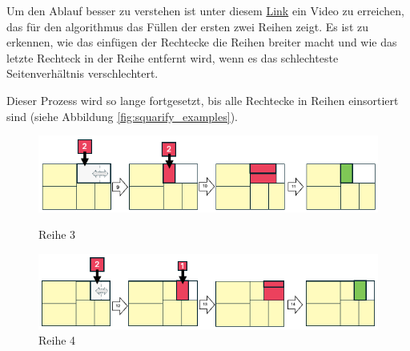 Um den Ablauf besser zu verstehen ist unter diesem \href{https://github.com/BenediktMehl/master-thesis/blob/main/images/squarify_example.gif}{Link} \cite{squarify_video_link} ein Video zu erreichen, das für den algorithmus das Füllen der ersten zwei Reihen zeigt. Es ist zu erkennen, wie das einfügen der Rechtecke die Reihen breiter macht und wie das letzte Rechteck in der Reihe entfernt wird, wenn es das schlechteste Seitenverhältnis verschlechtert.

Dieser Prozess wird so lange fortgesetzt, bis alle Rechtecke in Reihen einsortiert sind (siehe Abbildung \ref{fig:squarify_examples}).

\begin{figure}
    \centering
    \begin{minipage}{1\textwidth}
        \centering
        \includegraphics[width=\linewidth]{images/squarify_example_3.png}
        \caption*{Reihe 3}
    \end{minipage}
    
    \vspace{1em}
    
    \begin{minipage}{1\textwidth}
        \centering
        \includegraphics[width=\linewidth]{images/squarify_example_4.png}
        \caption*{Reihe 4}
    \end{minipage}
    
    \vspace{1em}
    

\end{figure}
